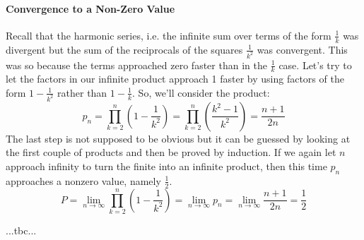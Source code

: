 \paragraph{Convergence to a Non-Zero Value}
Recall that the harmonic series, i.e. the infinite sum over terms of the form $\frac{1}{k}$ was divergent but the sum of the reciprocals of the squares $\frac{1}{k^2}$ was convergent. This was so because the terms approached zero faster than in the $\frac{1}{k}$ case. Let's try to let the factors in our infinite product approach 1 faster by using factors of the form $1 - \frac{1}{k^2}$ rather than $1 - \frac{1}{k}$. So, we'll consider the product:
\begin{equation}
 p_n = \prod_{k=2}^n  \left(1 - \frac{1}{k^2} \right)
     = \prod_{k=2}^n  \left(\frac{k^2-1}{k^2} \right)
     = \frac{n+1}{2n}
\end{equation}
The last step is not supposed to be obvious but it can be guessed by looking at the first couple of products and then be proved by induction.  If we again let $n$ approach infinity to turn the finite into an infinite product, then this time $p_n$ approaches a nonzero value, namely $\frac{1}{2}$.
\begin{equation}
P = \lim_{n \rightarrow \infty} \prod_{k=2}^{n} \left(1 - \frac{1}{k^2} \right)
  = \lim_{n \rightarrow \infty} p_n
  = \lim_{n \rightarrow \infty} \frac{n+1}{2n}
  = \frac{1}{2}
\end{equation}


...tbc...








